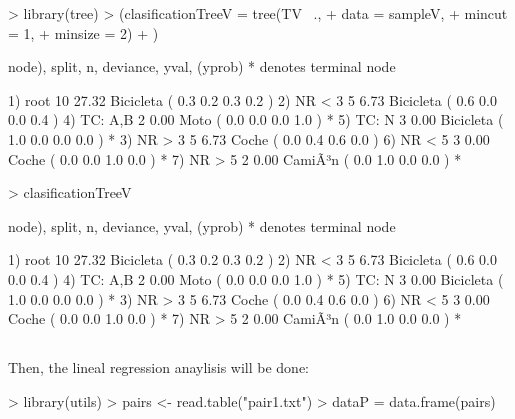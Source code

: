 \documentclass[a4paper]{article}
\begin{document}
\begin{Schunk}
\begin{Sinput}
> library(tree)
> (clasificationTreeV = tree(TV ~.,
+                           data = sampleV,
+                           mincut = 1,
+                           minsize = 2)
+ )
\end{Sinput}
\begin{Soutput}
node), split, n, deviance, yval, (yprob)
      * denotes terminal node

1) root 10 27.32 Bicicleta ( 0.3 0.2 0.3 0.2 )  
  2) NR < 3 5  6.73 Bicicleta ( 0.6 0.0 0.0 0.4 )  
    4) TC: A,B 2  0.00 Moto ( 0.0 0.0 0.0 1.0 ) *
    5) TC: N 3  0.00 Bicicleta ( 1.0 0.0 0.0 0.0 ) *
  3) NR > 3 5  6.73 Coche ( 0.0 0.4 0.6 0.0 )  
    6) NR < 5 3  0.00 Coche ( 0.0 0.0 1.0 0.0 ) *
    7) NR > 5 2  0.00 CamiÃ³n ( 0.0 1.0 0.0 0.0 ) *
\end{Soutput}
\begin{Sinput}
> clasificationTreeV
\end{Sinput}
\begin{Soutput}
node), split, n, deviance, yval, (yprob)
      * denotes terminal node

1) root 10 27.32 Bicicleta ( 0.3 0.2 0.3 0.2 )  
  2) NR < 3 5  6.73 Bicicleta ( 0.6 0.0 0.0 0.4 )  
    4) TC: A,B 2  0.00 Moto ( 0.0 0.0 0.0 1.0 ) *
    5) TC: N 3  0.00 Bicicleta ( 1.0 0.0 0.0 0.0 ) *
  3) NR > 3 5  6.73 Coche ( 0.0 0.4 0.6 0.0 )  
    6) NR < 5 3  0.00 Coche ( 0.0 0.0 1.0 0.0 ) *
    7) NR > 5 2  0.00 CamiÃ³n ( 0.0 1.0 0.0 0.0 ) *
\end{Soutput}
\end{Schunk}

\subsection{} Then, the lineal regression anaylisis will be done:
\begin{Schunk}
\begin{Sinput}
> library(utils)
> pairs <- read.table("pair1.txt")
> dataP = data.frame(pairs)
\end{Sinput}
\end{Schunk}


\section{}
\end{document}
